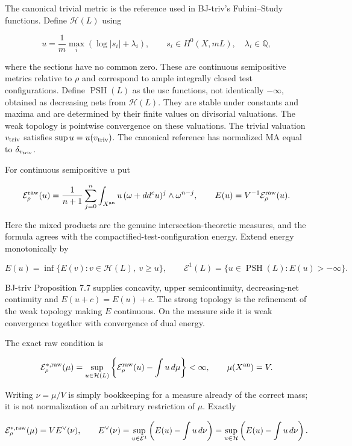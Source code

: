 \documentclass[
  11pt,
]{article}
\begin{document}
The canonical trivial metric is the reference used in BJ-triv's
Fubini--Study functions. Define \(\mathcal H(L)\) using

\[u=\frac1m\max_i(\log|s_i|+\lambda_i),\qquad s_i\in H^0(X,mL),\quad \lambda_i\in\mathbb Q,\]

where the sections have no common zero. These are continuous
semipositive metrics relative to \(\rho\) and correspond to ample
integrally closed test configurations. Define \(\operatorname{PSH}(L)\)
as the usc functions, not identically \(-\infty\), obtained as
decreasing nets from \(\mathcal H(L)\). They are stable under constants
and maxima and are determined by their finite values on divisorial
valuations. The weak topology is pointwise convergence on these
valuations. The trivial valuation \(v_{\rm triv}\) satisfies
\(\sup u=u(v_{\rm triv})\). The canonical reference has normalized MA
equal to \(\delta_{v_{\rm triv}}\).

For continuous semipositive \(u\) put

\[\mathcal E_{\rho}^{\rm raw}(u)=\frac1{n+1}\sum_{j=0}^n\int_{X^{\rm an}}u\, (\omega+dd^c u)^j\wedge\omega^{n-j},\qquad E(u)=V^{-1}\mathcal E_{\rho}^{\rm raw}(u).\]

Here the mixed products are the genuine intersection-theoretic measures,
and the formula agrees with the compactified-test-configuration energy.
Extend energy monotonically by

\[E(u)=\inf\{E(v):v\in\mathcal H(L),\ v\geq u\},\qquad \mathcal E^1(L)=\{u\in\operatorname{PSH}(L):E(u)>-\infty\}.\]

BJ-triv Proposition 7.7 supplies concavity, upper semicontinuity,
decreasing-net continuity and \(E(u+c)=E(u)+c\). The strong topology is
the refinement of the weak topology making \(E\) continuous. On the
measure side it is weak convergence together with convergence of dual
energy.

The exact raw condition is

\[\mathcal E_{\rho}^{*,\rm raw}(\mu)=\sup_{u\in\mathcal H(L)}\left\{\mathcal E_{\rho}^{\rm raw}(u)-\int u\,d\mu\right\}<\infty,\qquad \mu(X^{\rm an})=V.\]

Writing \(\nu=\mu/V\) is simply bookkeeping for a measure already of the
correct mass; it is not normalization of an arbitrary restriction of
\(\mu\). Exactly

\[\mathcal E_{\rho}^{*,\rm raw}(\mu)=V E^\vee(\nu),\qquad E^\vee(\nu)=\sup_{u\in\mathcal E^1}\left(E(u)-\int u\,d\nu\right)=\sup_{u\in\mathcal H}\left(E(u)-\int u\,d\nu\right).\]
\end{document}
